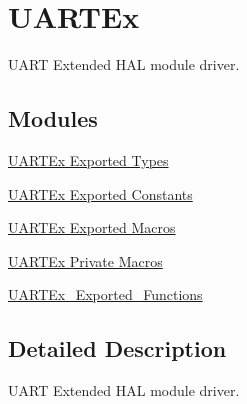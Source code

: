 \hypertarget{group___u_a_r_t_ex}{}\section{U\+A\+R\+T\+Ex}
\label{group___u_a_r_t_ex}


U\+A\+RT Extended H\+AL module driver.  


\subsection*{Modules}
\begin{DoxyCompactItemize}
\item 
\hyperlink{group___u_a_r_t_ex___exported___types}{U\+A\+R\+T\+Ex Exported Types}
\item 
\hyperlink{group___u_a_r_t_ex___exported___constants}{U\+A\+R\+T\+Ex Exported Constants}
\item 
\hyperlink{group___u_a_r_t_ex___exported___macros}{U\+A\+R\+T\+Ex Exported Macros}
\item 
\hyperlink{group___u_a_r_t_ex___private___macros}{U\+A\+R\+T\+Ex Private Macros}
\item 
\hyperlink{group___u_a_r_t_ex___exported___functions}{U\+A\+R\+T\+Ex\+\_\+\+Exported\+\_\+\+Functions}
\end{DoxyCompactItemize}


\subsection{Detailed Description}
U\+A\+RT Extended H\+AL module driver. 

